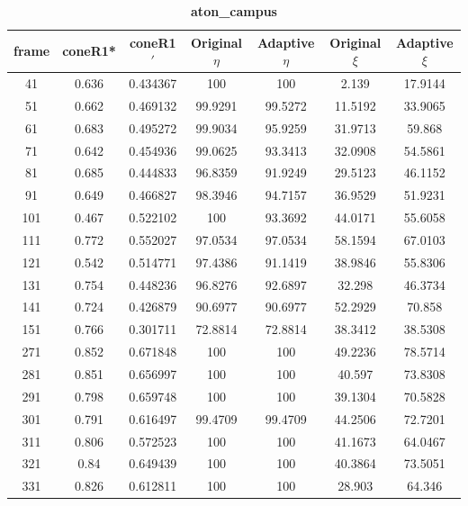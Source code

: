\begin{appendices}
\begin{table}
\centering
\caption{\textbf{aton\_campus}}
\begin{tabular}{ |c|c|c|c|c|c|c| }
\hline
\textbf{frame} &  \textbf{coneR1*} &  \textbf{coneR1$'$} &  \textbf{Original $\eta$} &  \textbf{Adaptive $\eta$} &  \textbf{Original $\xi$} &  \textbf{Adaptive $\xi$} \\
\hline
\hline
41 &  0.636 &  0.434367 &  100 &  100 &  2.139 &  17.9144 \\
\hline
51 &  0.662 &  0.469132 &  99.9291 &  99.5272 &  11.5192 &  33.9065 \\
\hline
61 &  0.683 &  0.495272 &  99.9034 &  95.9259 &  31.9713 &  59.868 \\
\hline
71 &  0.642 &  0.454936 &  99.0625 &  93.3413 &  32.0908 &  54.5861 \\
\hline
81 &  0.685 &  0.444833 &  96.8359 &  91.9249 &  29.5123 &  46.1152 \\
\hline
91 &  0.649 &  0.466827 &  98.3946 &  94.7157 &  36.9529 &  51.9231 \\
\hline
101 &  0.467 &  0.522102 &  100 &  93.3692 &  44.0171 &  55.6058 \\
\hline
111 &  0.772 &  0.552027 &  97.0534 &  97.0534 &  58.1594 &  67.0103 \\
\hline
121 &  0.542 &  0.514771 &  97.4386 &  91.1419 &  38.9846 &  55.8306 \\
\hline
131 &  0.754 &  0.448236 &  96.8276 &  92.6897 &  32.298 &  46.3734 \\
\hline
141 &  0.724 &  0.426879 &  90.6977 &  90.6977 &  52.2929 &  70.858 \\
\hline
151 &  0.766 &  0.301711 &  72.8814 &  72.8814 &  38.3412 &  38.5308 \\
\hline
271 &  0.852 &  0.671848 &  100 &  100 &  49.2236 &  78.5714 \\
\hline
281 &  0.851 &  0.656997 &  100 &  100 &  40.597 &  73.8308 \\
\hline
291 &  0.798 &  0.659748 &  100 &  100 &  39.1304 &  70.5828 \\
\hline
301 &  0.791 &  0.616497 &  99.4709 &  99.4709 &  44.2506 &  72.7201 \\
\hline
311 &  0.806 &  0.572523 &  100 &  100 &  41.1673 &  64.0467 \\
\hline
321 &  0.84 &  0.649439 &  100 &  100 &  40.3864 &  73.5051 \\
\hline
331 &  0.826 &  0.612811 &  100 &  100 &  28.903 &  64.346 \\

\end{tabular}
\end{table}
\end{appendices}
